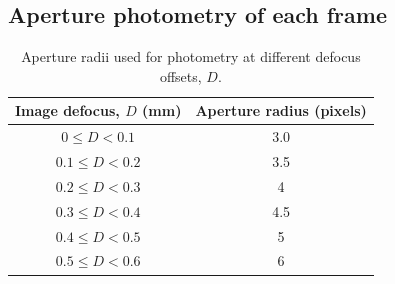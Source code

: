 \documentclass[fleqn,usenatbib]{mnras}
\newcommand{\tess}{{\it TESS}}
\newcommand{\gaia}{{\it Gaia}}
\begin{document}



\subsection{Aperture photometry of each frame}

\begin{table}
    \centering

    \caption{Aperture radii used for photometry at different defocus offsets, $D$.}
    \label{tab:aperture_sizes}
    \begin{tabular}{cc}
    \toprule
    Image defocus, $D$ (mm) & Aperture radius (pixels) \\
    \midrule
      $0\leq D < 0.1 $   & 3.0 \\
      $0.1\leq D < 0.2 $   & 3.5 \\
      $0.2\leq D < 0.3 $   & 4 \\
      $0.3\leq D < 0.4 $   & 4.5 \\
      $0.4\leq D < 0.5 $   & 5 \\
      $0.5\leq D < 0.6 $   & 6 \\
    \bottomrule
    \end{tabular}
\end{table}
\end{document}
